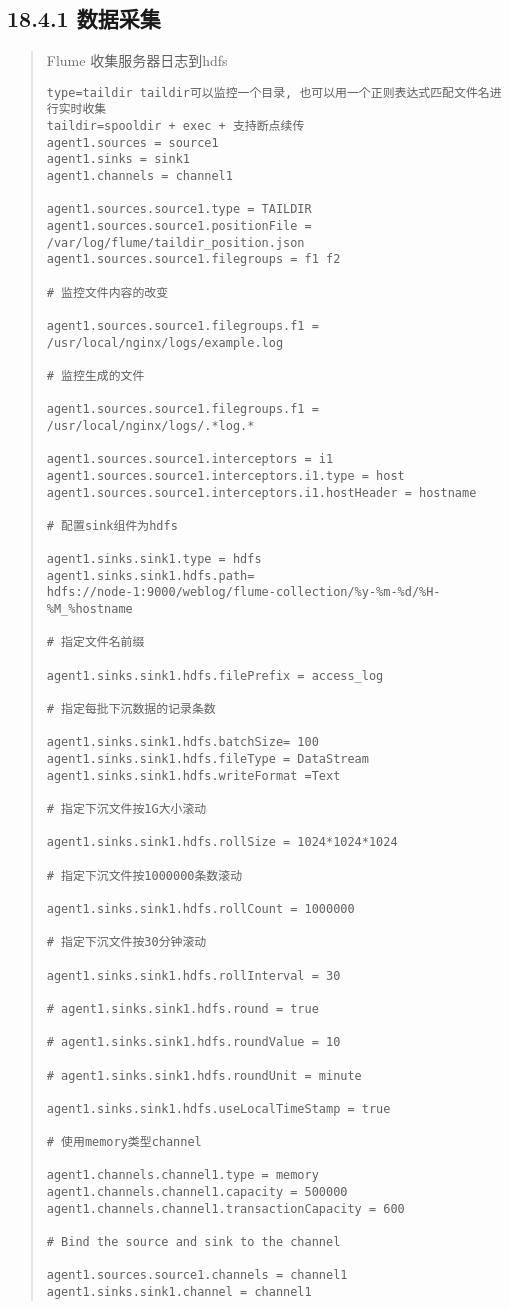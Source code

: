 \subsection{18.4.1 数据采集}\label{ux6570ux636eux91c7ux96c6}

\begin{quote}
Flume 收集服务器日志到hdfs

\begin{verbatim}
type=taildir taildir可以监控一个目录, 也可以用一个正则表达式匹配文件名进行实时收集
taildir=spooldir + exec + 支持断点续传
agent1.sources = source1
agent1.sinks = sink1
agent1.channels = channel1

agent1.sources.source1.type = TAILDIR 
agent1.sources.source1.positionFile = /var/log/flume/taildir_position.json
agent1.sources.source1.filegroups = f1 f2

# 监控文件内容的改变

agent1.sources.source1.filegroups.f1 = /usr/local/nginx/logs/example.log

# 监控生成的文件

agent1.sources.source1.filegroups.f1 = /usr/local/nginx/logs/.*log.*

agent1.sources.source1.interceptors = i1
agent1.sources.source1.interceptors.i1.type = host
agent1.sources.source1.interceptors.i1.hostHeader = hostname

# 配置sink组件为hdfs

agent1.sinks.sink1.type = hdfs
agent1.sinks.sink1.hdfs.path=
hdfs://node-1:9000/weblog/flume-collection/%y-%m-%d/%H-%M_%hostname

# 指定文件名前缀

agent1.sinks.sink1.hdfs.filePrefix = access_log

# 指定每批下沉数据的记录条数

agent1.sinks.sink1.hdfs.batchSize= 100
agent1.sinks.sink1.hdfs.fileType = DataStream
agent1.sinks.sink1.hdfs.writeFormat =Text

# 指定下沉文件按1G大小滚动

agent1.sinks.sink1.hdfs.rollSize = 1024*1024*1024

# 指定下沉文件按1000000条数滚动

agent1.sinks.sink1.hdfs.rollCount = 1000000

# 指定下沉文件按30分钟滚动

agent1.sinks.sink1.hdfs.rollInterval = 30

# agent1.sinks.sink1.hdfs.round = true

# agent1.sinks.sink1.hdfs.roundValue = 10

# agent1.sinks.sink1.hdfs.roundUnit = minute

agent1.sinks.sink1.hdfs.useLocalTimeStamp = true

# 使用memory类型channel

agent1.channels.channel1.type = memory
agent1.channels.channel1.capacity = 500000
agent1.channels.channel1.transactionCapacity = 600

# Bind the source and sink to the channel

agent1.sources.source1.channels = channel1
agent1.sinks.sink1.channel = channel1
\end{verbatim}
\end{quote}

